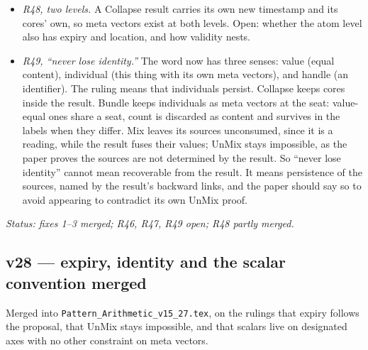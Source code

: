 \documentclass[11pt]{article}
\begin{document}
\begin{itemize}
\item \emph{R48, two levels.} A Collapse result carries its own new
timestamp and its cores' own, so meta vectors exist at both levels. Open:
whether the atom level also has expiry and location, and how validity nests.
\item \emph{R49, ``never lose identity.''} The word now has three senses:
value (equal content), individual (this thing with its own meta vectors),
and handle (an identifier). The ruling means that individuals persist.
Collapse keeps cores inside the result. Bundle keeps individuals as meta
vectors at the seat: value-equal ones share a seat, count is discarded as
content and survives in the labels when they differ. Mix leaves its sources
unconsumed, since it is a reading, while the result fuses their values;
UnMix stays impossible, as the paper proves the sources are not determined
by the result. So ``never lose identity'' cannot mean recoverable from the
result. It means persistence of the sources, named by the result's
backward links, and the paper should say so to avoid appearing to
contradict its own UnMix proof.
\end{itemize}
\emph{Status: fixes 1--3 merged; R46, R47, R49 open; R48 partly merged.}


\subsection*{v28 --- expiry, identity and the scalar convention merged}
Merged into \texttt{Pattern\_Arithmetic\_v15\_27.tex}, on the rulings that
expiry follows the proposal, that UnMix stays impossible, and that scalars
live on designated axes with no other constraint on meta vectors.
\end{document}
